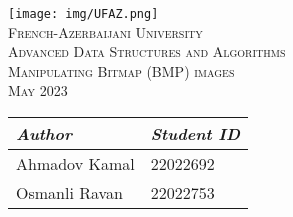 \documentclass{report}
\def\course{Advanced Data Structures and Algorithms}      %
\def\thetitle{Manipulating Bitmap (BMP) images}               %
\def\date{\10 May 2023}                             %
\begin{document}
\begin{center}
    \vspace*{1.5cm}
    \texttt{[image: img/UFAZ.png]}\\[1.75cm]
    \textsc{\color[RGB]{0, 51, 102}\LARGE{French-Azerbaijani University}}\\[1cm]
    \textsc{\Large{\course}}\\[.5cm]
    \textsc{\Large{\thetitle}}\\[.5cm]
    \textsc{\date}\\[2cm]
    \Large{
    \begin{tabular}{L{4cm} R{4cm}}
        \textit{Author} &  \textit{Student ID}\\
        \hline
        Ahmadov Kamal & 22022692\\
        Osmanli Ravan & 22022753
    \end{tabular}
    }
\end{center}
\thispagestyle{empty}
\pagebreak

\tableofcontents{}
\pagebreak

\end{document}
